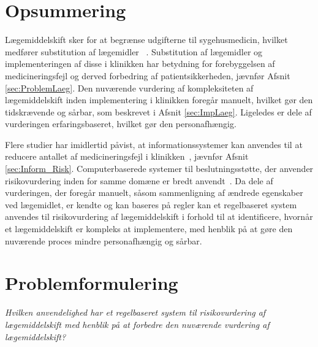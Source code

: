 \section{Opsummering}
Lægemiddelskift sker for at begrænse udgifterne til sygehusmedicin, hvilket medfører substitution af lægemidler ~\citep{Ess2003, Johnston2011}. Substitution af lægemidler og implementeringen af disse i klinikken har betydning for forebyggelsen af medicineringsfejl og derved forbedring af patientsikkerheden, jævnfør Afsnit \ref{sec:ProblemLaeg}. Den nuværende vurdering af kompleksiteten af lægemiddelskift inden implementering i klinikken foregår manuelt, hvilket gør den tidskrævende og sårbar, som beskrevet i Afsnit \ref{sec:ImpLaeg}. Ligeledes er dele af vurderingen erfaringsbaseret, hvilket gør den personafhængig.

Flere studier har imidlertid påvist, at informationssystemer kan anvendes til at reducere antallet af medicineringsfejl i klinikken~\citep{Agrawal2009, Stenner2010, Fischer2008, Simpson2008}, jævnfør Afsnit \ref{sec:Inform_Risk}. Computerbaserede systemer til beslutningsstøtte, der anvender risikovurdering inden for samme domæne er bredt anvendt~\citep{Geissert2018, Rawshani2018,Barbar2010, Koivu2018}. Da dele af vurderingen, der foregår manuelt, såsom sammenligning af ændrede egenskaber ved lægemidlet, er kendte og kan baseres på regler kan et regelbaseret system anvendes til risikovurdering af lægemiddelskift i forhold til at identificere, hvornår et lægemiddelskift er kompleks at implementere, med henblik på at gøre den nuværende proces mindre personafhængig og sårbar. 

\section{Problemformulering}
\textit{Hvilken anvendelighed har et regelbaseret system til risikovurdering af lægemiddelskift med henblik på at forbedre den nuværende vurdering af lægemiddelskift?}


